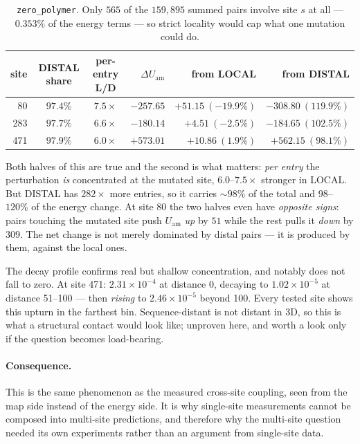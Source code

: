\documentclass[11pt,a4paper]{article}
\newcommand{\Uam}{U_{\mathrm{am}}}
\begin{document}
\begin{table}[htbp]
\centering
\small\setlength{\tabcolsep}{4pt}
\begin{tabular}{r c c r r r}
\toprule
site & DISTAL share & per-entry L/D
     & $\Delta\Uam$ & from LOCAL & from DISTAL \\
\midrule
 80 & $97.4\%$ & $7.5\times$ & $-257.65$ & $+51.15\ (-19.9\%)$ & $-308.80\ (119.9\%)$ \\
283 & $97.7\%$ & $6.6\times$ & $-180.14$ & $+4.51\ (-2.5\%)$   & $-184.65\ (102.5\%)$ \\
471 & $97.9\%$ & $6.0\times$ & $+573.01$ & $+10.86\ (1.9\%)$   & $+562.15\ (98.1\%)$ \\
\bottomrule
\end{tabular}
\caption{\texttt{zero\_polymer}. Only $565$ of the $159{,}895$ summed pairs
involve site $s$ at all --- $0.353\%$ of the energy terms --- so strict
locality would cap what one mutation could do.}
\label{tab:locality}
\end{table}

Both halves of this are true and the second is what matters:
\emph{per entry} the perturbation \emph{is} concentrated at the mutated
site, $6.0$--$7.5\times$ stronger in LOCAL. But DISTAL has $282\times$ more
entries, so it carries $\sim\!98\%$ of the total and $98$--$120\%$ of the
energy change. At site 80 the two halves even have \emph{opposite signs}:
pairs touching the mutated site push $\Uam$ \emph{up} by $51$ while the rest
pulls it \emph{down} by $309$. The net change is not merely dominated by
distal pairs --- it is produced by them, against the local ones.

The decay profile confirms real but shallow concentration, and notably does
not fall to zero. At site 471: $2.31\times10^{-4}$ at distance 0, decaying to
$1.02\times10^{-5}$ at distance 51--100 --- then \emph{rising} to
$2.46\times10^{-5}$ beyond 100. Every tested site shows this upturn in the
farthest bin. Sequence-distant is not distant in 3D, so this is what a
structural contact would look like; unproven here, and worth a look only if
the question becomes load-bearing.

\paragraph{Consequence.} This is the same phenomenon as the measured
cross-site coupling, seen from the map side instead of the energy side. It is
why single-site measurements cannot be composed into multi-site predictions,
and therefore why the multi-site question needed its own experiments rather
than an argument from single-site data.
\end{document}

